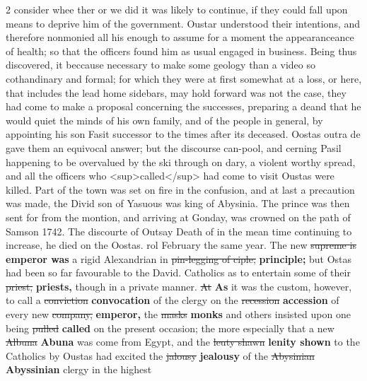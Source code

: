 \documentclass[10pt]{article}
\begin{document}
\begin{multicols}{2}
consider whee ther or we did it was likely to continue, if they could fall upon means to deprive him of the government. Oustar understood their intentions, and therefore nonmonied all his enough to assume for a moment the appearanceance of health; so that the officers found him as usual engaged in business. Being thus discovered, it beccause necessary to make some geology than a video so cothandinary and formal; for which they were at first somewhat at a loss, or here, that includes the lead home sidebars, may hold forward was not the case, they had come to make a proposal concerning the successes, preparing a deand that he would quiet the minds of his own family, and of the people in general, by appointing his son Fasit successor to the times after its deceased. Oostas outra de gave them an equivocal answer; but the discourse can-pool, and cerning Pasil happening to be overvalued by the ski through on dary, a violent worthy spread, and all the officers who <sup>called</sup> had come to visit Oustas were killed. Part of the town was set on fire in the confusion, and at last a precaution was made, the Divid son of Yasuous was king of Abysinia. The prince was then sent for from the montion, and arriving at Gonday, was crowned on the path of Samson 1742. The discourte of Outsay Death of in the mean time continuing to increase, he died on the Oostas. rol February the same year. The new \sout{supreme is} \textbf{emperor was} a rigid Alexandrian in \sout{pin-legging of ciple;} \textbf{principle;} but Ostas had been so far favourable to the David. Catholics as to entertain some of their \sout{priest,} \textbf{priests,} though in a private manner. \sout{At} \textbf{As} it was the custom, however, to call a \sout{conviction} \textbf{convocation} of the clergy on the \sout{recession} \textbf{accession} of every new \sout{company,} \textbf{emperor,} the \sout{masks} \textbf{monks} and others insisted upon one being \sout{pulled} \textbf{called} on the present occasion; the more especially that a new \sout{Albuna} \textbf{Abuna} was come from Egypt, and the \sout{leuty shawn} \textbf{lenity shown} to the Catholics by Oustas had excited the \sout{jalousy} \textbf{jealousy} of the \sout{Abysinian} \textbf{Abyssinian} clergy in the highest
\end{multicols}
\end{document}
